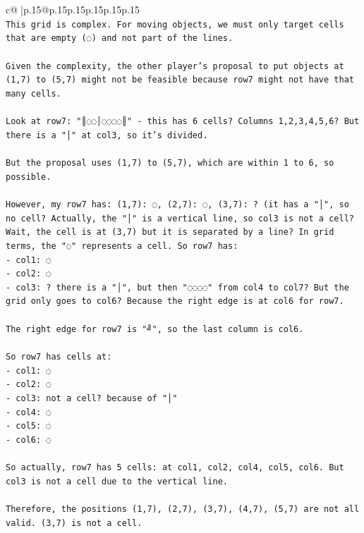 \documentclass{article}
\begin{document}
{\begin{supertabular}{c@{$\;$}|p{.15\linewidth}@{}p{.15\linewidth}p{.15\linewidth}p{.15\linewidth}p{.15\linewidth}p{.15\linewidth}}
{{{\\ 
\texttt{This grid is complex. For moving objects, we must only target cells that are empty (◌) and not part of the lines.} \\
\\ 
\texttt{Given the complexity, the other player's proposal to put objects at (1,7) to (5,7) might not be feasible because row7 might not have that many cells.} \\
\\ 
\texttt{Look at row7: "║◌◌│◌◌◌◌║" {-} this has 6 cells? Columns 1,2,3,4,5,6? But there is a "│" at col3, so it's divided.} \\
\\ 
\texttt{But the proposal uses (1,7) to (5,7), which are within 1 to 6, so possible.} \\
\\ 
\texttt{However, my row7 has: (1,7): ◌, (2,7): ◌, (3,7): ? (it has a "│", so no cell? Actually, the "│" is a vertical line, so col3 is not a cell? Wait, the cell is at (3,7) but it is separated by a line? In grid terms, the "◌" represents a cell. So row7 has:} \\
\texttt{{-} col1: ◌} \\
\texttt{{-} col2: ◌} \\
\texttt{{-} col3: ? there is a "│", but then "◌◌◌◌" from col4 to col7? But the grid only goes to col6? Because the right edge is at col6 for row7.} \\
\\ 
\texttt{The right edge for row7 is "╝", so the last column is col6.} \\
\\ 
\texttt{So row7 has cells at:} \\
\texttt{{-} col1: ◌} \\
\texttt{{-} col2: ◌} \\
\texttt{{-} col3: not a cell? because of "│"} \\
\texttt{{-} col4: ◌} \\
\texttt{{-} col5: ◌} \\
\texttt{{-} col6: ◌} \\
\\ 
\texttt{So actually, row7 has 5 cells: at col1, col2, col4, col5, col6. But col3 is not a cell due to the vertical line.} \\
\\ 
\texttt{Therefore, the positions (1,7), (2,7), (3,7), (4,7), (5,7) are not all valid. (3,7) is not a cell.} \\
\\ 
}}}
\end{supertabular}}
\end{document}
